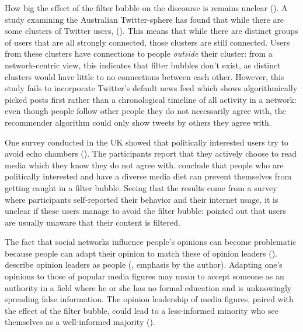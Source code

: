 How big the effect of the filter bubble on the discourse is remains unclear (\cite{brunsEchoChamberWhat2017}). A study examining the Australian Twitter-sphere has found that while there are some clusters of Twitter users,  (\cite[9]{brunsEchoChamberWhat2017}). This means that while there are distinct groups of users that are all strongly connected, those clusters are still connected. Users from these clusters have connections to people \emph{outside} their cluster: from a network-centric view, this indicates that filter bubbles don't exist, as distinct clusters would have little to no connections between each other. However, this study fails to incorporate Twitter's default news feed which shows algorithmically picked posts first rather than a chronological timeline of all activity in a network: even though people follow other people they do not necessarily agree with, the recommender algorithm could only show tweets by others they agree with.

One survey conducted in the UK showed that politically interested users try to avoid echo chambers (\cite{duboisEchoChamberOverstated2018}). The participants report that they actively choose to read media which they know they do not agree with. \citeauthor{duboisEchoChamberOverstated2018} conclude that people who are politically interested and have a diverse media diet can prevent themselves from getting caught in a filter bubble. Seeing that the results come from a survey where participants self-reported their behavior and their internet usage, it is unclear if these users manage to avoid the filter bubble: \citeauthor{bozdagBreakingFilterBubble2015} pointed out that users are usually unaware that their content is filtered. 

The fact that social networks influence people's opinions can become problematic because people can adapt their opinion to match these of opinion leaders (\cite{altafiniDynamicsOpinionForming2012}). \citeauthor{gokceTwitterPoliticsIdentifying2014} describe opinion leaders as people  (\cite[673]{gokceTwitterPoliticsIdentifying2014}, emphasis by the author). Adapting one's opinions to those of popular media figures may mean to accept someone as an authority in a field where he or she has no formal education and is unknowingly spreading false information. The opinion leadership of media figures, paired with the effect of the filter bubble, could lead to a less-informed minority who see themselves as a well-informed majority (\cite{moscoviciSilentMajoritiesLoud1991}).

